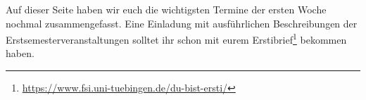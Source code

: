 Auf dieser Seite haben wir euch die wichtigsten Termine der ersten Woche nochmal zusammengefasst. Eine Einladung mit ausführlichen Beschreibungen der Erstsemesterveranstaltungen solltet ihr schon mit eurem Erstibrief\footnote{\url{https://www.fsi.uni-tuebingen.de/du-bist-ersti/}} bekommen haben.




